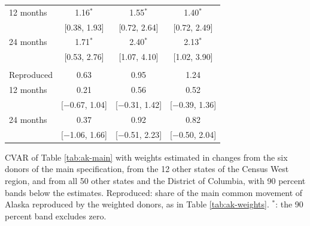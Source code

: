 \begin{table}[htbp]
\begin{tabular}{lccc}
12 months & 1.16$^{*}$ & 1.55$^{*}$ & 1.40$^{*}$ \\
 & [0.38, 1.93] & [0.72, 2.64] & [0.72, 2.49] \\
24 months & 1.71$^{*}$ & 2.40$^{*}$ & 2.13$^{*}$ \\
 & [0.53, 2.76] & [1.07, 4.10] & [1.02, 3.90] \\
\addlinespace
\multicolumn{4}{l}{Retail trade} \\
Reproduced & 0.63 & 0.95 & 1.24 \\
12 months & 0.21 & 0.56 & 0.52 \\
 & [$-$0.67, 1.04] & [$-$0.31, 1.42] & [$-$0.39, 1.36] \\
24 months & 0.37 & 0.92 & 0.82 \\
 & [$-$1.06, 1.66] & [$-$0.51, 2.23] & [$-$0.50, 2.04] \\
\bottomrule
\end{tabular}
\par\smallskip\parbox{0.95\textwidth}{\footnotesize CVAR of Table \ref{tab:ak-main} with weights estimated in changes from the six donors of the main specification, from the 12 other states of the Census West region, and from all 50 other states and the District of Columbia, with 90 percent bands below the estimates. Reproduced: share of the main common movement of Alaska reproduced by the weighted donors, as in Table \ref{tab:ak-weights}. $^{*}$: the 90 percent band excludes zero.}
\end{table}
